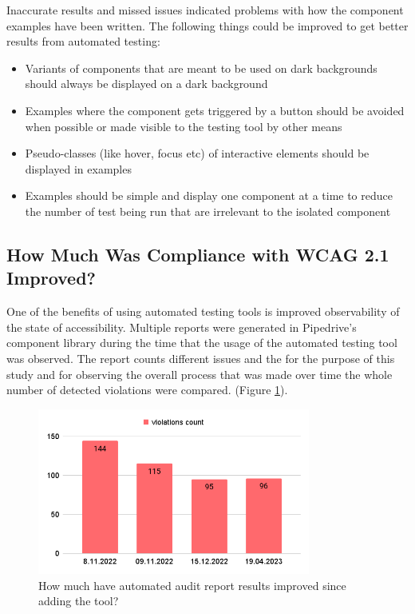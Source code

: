 \documentclass{master_thesis}
\begin{document}
Inaccurate results and missed issues indicated problems with how the component examples have been written. The following things could be improved to get better results from automated testing:
\begin{itemize}
	\item Variants of components that are meant to be used on dark backgrounds should always be displayed on a dark background
	\item Examples where the component gets triggered by a button should be avoided when possible or made visible to the testing tool by other means
	\item Pseudo-classes (like hover, focus etc) of interactive elements should be displayed in examples
	\item Examples should be simple and display one component at a time to reduce the number of test being run that are irrelevant to the isolated component
\end{itemize}

\subsection{How Much Was Compliance with WCAG 2.1 Improved?}


One of the benefits of using automated testing tools is improved observability of the state of accessibility.
Multiple reports were generated in Pipedrive's component library during the time that the usage of the automated testing tool was observed. The report counts different issues and the for the purpose of this study and for observing the overall process that was made over time the whole number of detected violations were compared. (Figure \ref{fig:automted-reports}).

\begin{figure}[ht]
	\centering
	\includegraphics[width=0.8\textwidth]{img/automated-audit-reports.png}
	\caption{How much have automated audit report results improved since adding the tool?}
	\label{fig:automted-reports}
\end{figure}
\end{document}

